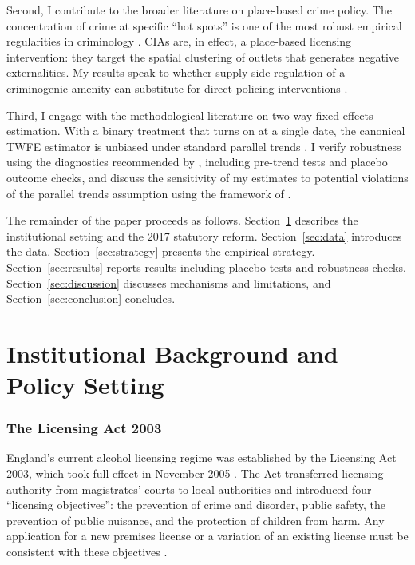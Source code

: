\documentclass[12pt]{article}
\begin{document}
Second, I contribute to the broader literature on place-based crime policy. The concentration of crime at specific ``hot spots'' is one of the most robust empirical regularities in criminology \citep{weisburd2015place, braga2019hot}. CIAs are, in effect, a place-based licensing intervention: they target the spatial clustering of outlets that generates negative externalities. My results speak to whether supply-side regulation of a criminogenic amenity can substitute for direct policing interventions \citep{green2007uk, hadfield2006bar}.

Third, I engage with the methodological literature on two-way fixed effects estimation. With a binary treatment that turns on at a single date, the canonical TWFE estimator is unbiased under standard parallel trends \citep{callaway2021difference, goodman2021difference}. I verify robustness using the diagnostics recommended by \citet{roth2023s}, including pre-trend tests and placebo outcome checks, and discuss the sensitivity of my estimates to potential violations of the parallel trends assumption using the framework of \citet{rambachan2023more}.

The remainder of the paper proceeds as follows. Section~\ref{sec:background} describes the institutional setting and the 2017 statutory reform. Section~\ref{sec:data} introduces the data. Section~\ref{sec:strategy} presents the empirical strategy. Section~\ref{sec:results} reports results including placebo tests and robustness checks. Section~\ref{sec:discussion} discusses mechanisms and limitations, and Section~\ref{sec:conclusion} concludes.


\section{Institutional Background and Policy Setting}
\label{sec:background}

\subsubsection*{The Licensing Act 2003} England's current alcohol licensing regime was established by the Licensing Act 2003, which took full effect in November 2005 \citep{licensingact2003}. The Act transferred licensing authority from magistrates' courts to local authorities and introduced four ``licensing objectives'': the prevention of crime and disorder, public safety, the prevention of public nuisance, and the protection of children from harm. Any application for a new premises license or a variation of an existing license must be consistent with these objectives \citep{homeoffice2018guidance}.
\end{document}
